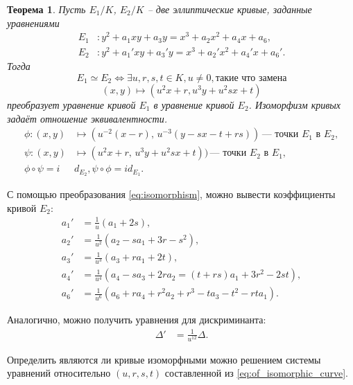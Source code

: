 \documentclass[12pt]{article}
\newtheorem{theorem}{Теорема}
\theoremstyle{definition}
\theoremstyle{definition}
\theoremstyle{definition}
\begin{document}
\begin{theorem}
\label{th:isomorphisms}
Пусть $E_1/K$, $E_2/K$ -- две эллиптические кривые, заданные уравнениями 
\begin{equation}
\label{eq:isom_E1_E2}
	\begin{split}
	E_1&: y^2+a_1xy + a_3y = x^3 + a_2x^2 + a_4x + a_6, \\
	E_2&: y^2+a_1'xy + a_3'y = x^3 + a_2'x^2 + a_4'x + a_6'.
	\end{split}
\end{equation}
Тогда
\begin{equation*}
E_1 \simeq E_2 \iff \exists u,r,s,t \in K, u\neq0, \text{такие что замена}
	\end{equation*}
	\begin{equation}
	\label{eq:isomorphism}
	(x,y) \mapsto (u^2x+r, u^3y+ u^2sx+t)
	\end{equation}
	преобразует уравнение кривой $E_1$ в уравнение кривой $E_2$. Изоморфизм кривых задаёт отношение эквивалентности.
	\begin{align*}
	\phi : (x,y)&\mapsto (u^{-2}(x-r), \,u^{-3}(y-sx-t+rs))\,\text{— точки $E_1$ в $E_2$}, \\
	\psi : (x,y)&\mapsto (u^2x+r, \,u^3y+u^2sx+t))\, \text{— точки $E_2$ в $E_1$}, \\
	\phi \circ \psi = i&d_{E_2}, \psi \circ \phi = id_{E_1}.
	\end{align*}
\end{theorem}

С помощью преобразования \eqref{eq:isomorphism}, можно вывести коэффициенты кривой $E_2$:
\begin{equation}
\label{eq:of_isomorphic_curve}
\begin{split}
a_1' &= \frac{1}{u}(a_1+2s), \\ 
a_2' &= \frac{1}{u^2}(a_2-sa_1+3r-s^2), \\
a_3' &= \frac{1}{u^3}(a_3+ra_1+2t), \\
a_4' &= \frac{1}{u^4}(a_4 - sa_3 + 2ra_2 = (t+rs)a_1 + 3r^2 - 2st), \\
a_6' &= \frac{1}{u^6}(a_6 + ra_4 + r^2a_2 + r^3 - ta_3 - t^2 - rta_1).
\end{split}
\end{equation}

Аналогично, можно получить уравнения для дискриминанта:
\begin{align*}
\Delta' &= \frac{1}{u^{12}}\Delta.
\end{align*}

Определить являются ли кривые изоморфными можно
решением системы уравнений относительно $(u,r,s,t)$ составленной из \eqref{eq:of_isomorphic_curve}.
\end{document}
